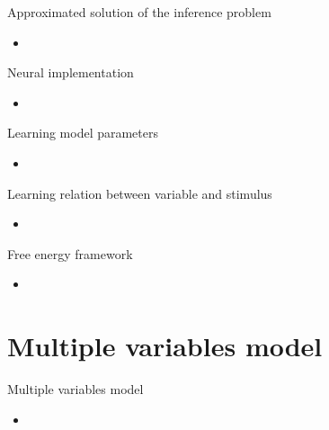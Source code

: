 \documentclass[aspectratio=43]{beamer}
\begin{document}

\begin{frame}{Approximated solution of the inference problem}
  \begin{itemize}
    \item %
  \end{itemize}
\end{frame}


\begin{frame}{Neural implementation}
  \begin{itemize}
    \item %
  \end{itemize}
\end{frame}


\begin{frame}{Learning model parameters}
  \begin{itemize}
    \item %
  \end{itemize}
\end{frame}

\begin{frame}{Learning relation between variable and stimulus}
  \begin{itemize}
    \item %
  \end{itemize}
\end{frame}

\begin{frame}{Free energy framework}
  \begin{itemize}
    \item %
  \end{itemize}
\end{frame}



\section{Multiple variables model}
\begin{frame}{Multiple variables model}
  \begin{itemize}
    \item %
  \end{itemize}
\end{frame}
\end{document}
